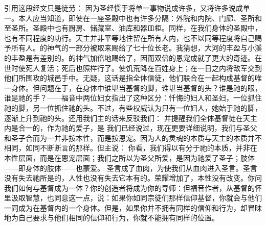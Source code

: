 引用这段经文只是徒劳： 因为圣经惯于将单一事物说成许多，又将许多说成单一。本人应当知道，即使在一座圣殿中也有许多分隔：外院和内院、门廊、圣所和至圣所。圣殿中也有厨房、储藏室、油库和器皿柜。同样，在我们身体的圣殿中，也有不同程度的功行。天主并非平等地住留在所有人内，也不以同等程度将自己赐予所有人。的神气的一部分被取来赐给了七十位长老。我猜想，大河的丰盈与小溪的丰盈是有差别的。的神气加倍地赐给了，因而双倍的恩宠成就了更大的奇迹。在世时使死人复活；死后也照样行了。使饥荒降在百姓身上；在一日之内将敌军交到他们所围攻的城邑手中。无疑，这话是指全体信徒，他们联合在一起构成基督的唯一身体。但问题在于，在身体中谁堪当基督的脚，谁堪当基督的头？谁是祂的眼，谁是祂的手？——福音中两位妇女指出了这种区分：忏悔的妇人和圣妇，一位抓住祂的脚，另一位抓住祂的头。不过，有些权威认为只有一位妇人，她始于祂的脚，逐渐上升到祂的头。还用我们主的话来反驳我们： 并提醒我们全体基督徒在天主内是合一的，作为祂的爱子，是 我们已经说过，现在更要详细说明，我们与圣父和圣子合而为一并非按本性，而是按恩宠。因为人的灵魂的本质与天主的本质并不相同，如同不断断言的那样。但主说： 你看，我们得以有分于祂的本质，并非在本性层面，而是在恩宠层面；我们之所以为圣父所爱，是因为祂爱了圣子；肢体——即身体的肢体——也蒙爱。 圣言成了血肉，为使我们从血肉进入圣言。圣言没有失去祂所是的，人性也没有失去它本有的。荣耀增加了，本性没有改变。你问我们如何与基督成为一体？你的创造者将成为你的导师：但福音作者，从基督的怀里汲取智慧，也同意这一点，说：如果你如同宗徒们那样信仰基督，你就会与他们一同成为在基督内的一个身体。但是，如果你并不拥有同样的信仰和行为，却冒昧地为自己要求与他们相同的信仰和行为，你就不能拥有同样的位置。\par

